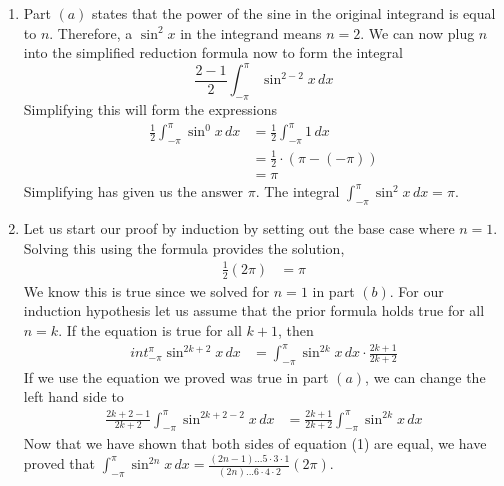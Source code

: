 \documentclass{article}
\begin{document}
\begin{enumerate}[label=\textbf{(4.\arabic*)}]
\begin{enumerate}
    \item Part $(a)$ states that the power of the sine in the original integrand is equal to $n$. Therefore, a $\sin^2x$ in the integrand means $n=2$. We can now plug $n$ into the simplified reduction formula now to form the integral
    \[\frac{2-1}{2}\int_{-\pi}^{\pi}\!\sin^{2-2}x\,dx\]
    Simplifying this will form the expressions
    \begin{align*}
        \frac{1}{2}\int_{-\pi}^{\pi}\!\sin^{0}x\,dx &=\frac{1}{2}\int_{-\pi}^{\pi}\!1\,dx \\
        &=\frac{1}{2}\cdot\left(\pi-(-\pi)\right) \\
        &=\pi
    \end{align*}
    Simplifying has given us the answer $\pi$. The integral $\int_{-\pi}^{\pi}\sin^2x\,dx=\pi$.

    \item Let us start our proof by induction by setting out the base case where $n=1$. Solving this using the formula provides the solution,
    \begin{align*}
        \frac{1}{2}(2\pi)&=\pi
    \end{align*}
    We know this is true since we solved for $n=1$ in part $(b)$. For our induction hypothesis let us assume that the prior formula holds true for all $n=k$. If the equation is true for all $k+1$, then
    \begin{align}
        int_{-\pi}^{\pi}\sin^{2k+2}x\,dx&=\int_{-\pi}^{\pi}\sin^{2k}x\,dx\cdot\frac{2k+1}{2k+2}
    \end{align}
    If we use the equation we proved was true in part $(a)$, we can change the left hand side to
    \begin{align*}
        \frac{2k+2-1}{2k+2}\int_{-\pi}^{\pi}\sin^{2k+2-2}x\,dx&=\frac{2k+1}{2k+2}\int_{-\pi}^{\pi}\sin^{2k}x\,dx  
    \end{align*}
    Now that we have shown that both sides of equation (1) are equal, we have proved that $\int_{-\pi}^{\pi}\sin^{2n}x\,dx=\frac{(2n-1)...5\cdot3\cdot1}{(2n)...6\cdot4\cdot2}(2\pi)$.
    
\end{enumerate}
\end{enumerate}
\end{document}
